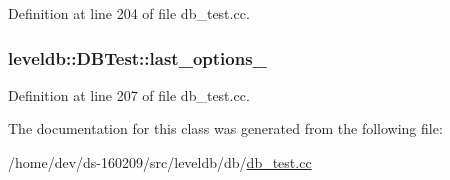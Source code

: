 Definition at line 204 of file db\+\_\+test.\+cc.

\hypertarget{classleveldb_1_1_d_b_test_adc05df912917d8de411d0672af04330f}{}
\subsubsection[{last\+\_\+options\+\_\+}]{ leveldb\+::\+D\+B\+Test\+::last\+\_\+options\+\_\+}\label{classleveldb_1_1_d_b_test_adc05df912917d8de411d0672af04330f}


Definition at line 207 of file db\+\_\+test.\+cc.



The documentation for this class was generated from the following file\+:\begin{DoxyCompactItemize}
\item 
/home/dev/ds-\/160209/src/leveldb/db/\hyperlink{db__test_8cc}{db\+\_\+test.\+cc}\end{DoxyCompactItemize}
